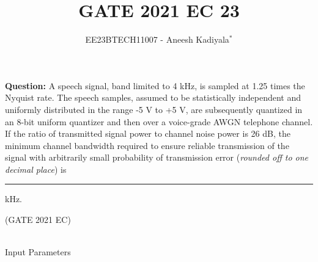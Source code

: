 \documentclass[journal,12pt,twocolumn]{IEEEtran}
\theoremstyle{remark}
\begin{document}

\vspace{3cm}

\title{GATE 2021 EC 23}
\author{EE23BTECH11007 - Aneesh Kadiyala$^{*}$%
}
\maketitle
\newpage
\bigskip

\renewcommand{\thefigure}{\theenumi}
\renewcommand{\thetable}{\theenumi}

\vspace{3cm}
\textbf{Question:} A speech signal, band limited to 4 kHz, is sampled at 1.25 times the Nyquist rate. The speech samples, assumed to be statistically independent and uniformly distributed in the range -5 V to +5 V, are subsequently quantized in an 8-bit uniform quantizer and then over a voice-grade AWGN telephone channel. If the ratio of transmitted signal power to channel noise power is 26 dB, the minimum channel bandwidth required to ensure reliable transmission of the signal with arbitrarily small probability of transmission error (\textit{rounded off to one decimal place}) is \rule{1cm}{0.15mm} kHz.

\hfill(GATE 2021 EC)
\\
\solution
\\
\begin{table}[h!]
    \centering
    \caption{Input Parameters}
    \label{tab:2021ec23_1}
    
\end{table}
\end{document}
